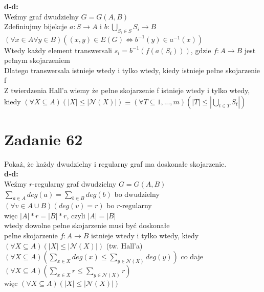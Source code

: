 \documentclass{article}
\begin{document}
\textbf{d-d:}\\
Weźmy graf dwudzielny $G = G(A, B)$\\
Zdefiniujmy bijekcje $a: S \rightarrow A$ i $b: \bigcup_{S_i \in S} S_i \rightarrow B$\\
$(\forall x \in A \forall y \in B)((x,y) \in E(G) \Leftrightarrow b^{-1}(y) \in a^{-1}(x))$\\
Wtedy każdy element transwersali $s_i = b^{-1}(f(a(S_i)))$, gdzie $f: A \rightarrow B$ jest pełnym skojarzeniem\\
Dlatego transwersala istnieje wtedy i tylko wtedy, kiedy istnieje pełne skojarzenie f\\
Z twierdzenia Hall'a wiemy że pełne skojarzenie f istnieje wtedy i tylko wtedy, kiedy $(\forall X \subseteq A)(|X| \leq |\mathcal{N}(X)|) \equiv (\forall T \subseteq {1, ..., m})(|T| \leq |\bigcup_{t \in T} S_t|)$\\
\section{\centering Zadanie 62}
Pokaż, że każdy dwudzielny i regularny graf ma doskonałe skojarzenie.\\
\textbf{d-d:}\\
Weźmy $r$-regularny graf dwudzielny $G = G(A,B)$\\
$\sum_{a \in A} deg(a) = \sum_{b \in B} deg(b)$ bo dwudzielny\\
$(\forall v \in A \cup B)(deg(v) = r)$ bo $r$-regularny\\
więc $|A| * r = |B| * r$, czyli $|A| = |B|$\\
wtedy dowolne pełne skojarzenie musi być doskonałe\\
pełne skojarzenie $f: A \rightarrow B$ istnieje wtedy i tylko wtedy, kiedy $(\forall X \subseteq A)(|X| \leq |\mathcal{N}(X)|)$ (tw. Hall'a)\\
$(\forall X \subseteq A)(\sum_{x \in X} deg(x) \leq \sum_{y \in \mathcal{N}(X)} deg(y))$ co daje $(\forall X \subseteq A)(\sum_{x \in X} r \leq \sum_{y \in \mathcal{N}(X)} r)$\\
więc $(\forall X \subseteq A)(|X| \leq |\mathcal{N}(X)|)$\\
\end{document}
